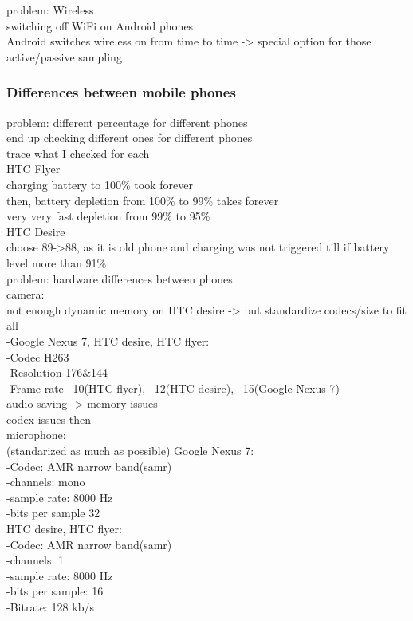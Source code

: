 problem: Wireless\\
	switching off WiFi on Android phones\\
		Android switches wireless on from time to time -> special option for those \\
	active/passive sampling\\

\subsubsection{Differences between mobile phones}
problem: different percentage for different phones\\
	end up checking different ones for different phones\\
		trace what I checked for each\\
		HTC Flyer\\
			charging battery to 100\% took forever\\
			then, battery depletion from 100\% to 99\% takes forever\\
			very very fast depletion from 99\% to 95\%\\
		HTC Desire\\
			choose 89->88, as it is old phone and charging was not triggered till if battery level more than 91\%\\
		
problem: hardware differences between phones\\
	camera:\\
		not enough dynamic memory on HTC desire -> but standardize codecs/size to fit all\\
		-Google Nexus 7, HTC desire, HTC flyer:\\
					-Codec H263\\
					-Resolution	176\&144\\
					-Frame rate		~10(HTC flyer),	~12(HTC desire),	~15(Google Nexus 7)\\
		audio saving -> memory issues\\
			codex issues then\\
	microphone:\\
		(standarized as much as possible)
		Google Nexus 7:\\
			-Codec: AMR narrow band(samr)\\
			-channels: 		mono\\
			-sample rate:	8000 Hz\\
			-bits per sample 	32\\
		HTC desire, HTC flyer:\\
			-Codec: AMR narrow band(samr)\\
			-channels:		1\\
			-sample rate:	8000 Hz\\
			-bits per sample:	16\\
			-Bitrate:		128 kb/s	\\
			
